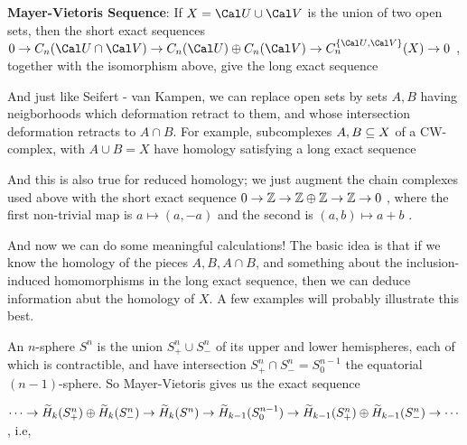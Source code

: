 \msk

{\bf Mayer-Vietoris Sequence}: If $X={\Cal U}\cup{\Cal V}$ is the union of two open sets, then
the short exact sequences \hhsk 
$0\ra C_n({\Cal U}\cap {\Cal V}) \ra C_n({\Cal U})\oplus C_n({\Cal V}) \ra C_n^{\{ {\Cal U},{\Cal V}\}}(X)\ra 0$
\hhsk , together with the isomorphism above, give the long exact sequence


\msk

And just like Seifert - van Kampen, we can replace open sets by sets $A,B$ having neigborhoods which deformation
retract to them, and whose intersection deformation retracts to $A\cap B$. For example,
subcomplexes $A,B\subseteq X$ of a CW-complex, with $A\cup B = X$ have homology satisfying a long
exact sequence

\ssk


\ssk

And this is also true for reduced homology; we just augment the chain complexes used above with the 
short exact sequence \hhsk $0\rightarrow {\Bbb Z}\rightarrow {\Bbb Z}\oplus {\Bbb Z} \rightarrow {\Bbb Z} \rightarrow 0$ , 
where the first non-trivial map is $a\mapsto (a,-a)$ and the second is $(a,b)\mapsto a+b$ .

\msk

And now we can do some meaningful calculations! 
The basic idea is that if we know the homology of the pieces $A,B,A\cap B$, and something
about the inclusion-induced homomorphisms in the long
exact sequence, then we can deduce information abut the
homology of $X$. A few examples will probably illustrate this best.

\msk

An $n$-sphere $S^n$
is the union $S^n_+\cup S^n_-$ of its upper and lower hemispheres, each of which 
is contractible, and have intersection $S^n_+\cap S^n_-=S^{n-1}_0$ the equatorial
$(n-1)$-sphere. So Mayer-Vietoris gives us the exact sequence

\hhsk $\cdots \rightarrow \widetilde{H}_k(S^n_+)\oplus \widetilde{H}_k(S^n_-) \rightarrow \widetilde{H}_k(S^n)
\rightarrow \widetilde{H}_{k-1}(S^{n-1}_0) \rightarrow \widetilde{H}_{k-1}(S^n_+)\oplus \widetilde{H}_{k-1}(S^n_-)\rightarrow \cdots$ 
\hhsk , i.e, \hhsk

